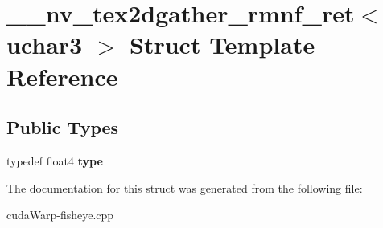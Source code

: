\hypertarget{struct____nv__tex2dgather__rmnf__ret_3_01uchar3_01_4}{}\section{\+\_\+\+\_\+nv\+\_\+tex2dgather\+\_\+rmnf\+\_\+ret$<$ uchar3 $>$ Struct Template Reference}
\label{struct____nv__tex2dgather__rmnf__ret_3_01uchar3_01_4}
\subsection*{Public Types}
\begin{DoxyCompactItemize}
\item 
typedef float4 {\bfseries type}\hypertarget{struct____nv__tex2dgather__rmnf__ret_3_01uchar3_01_4_a0481a8855f6173cbe7e1fbc8589a9fb5}{}\label{struct____nv__tex2dgather__rmnf__ret_3_01uchar3_01_4_a0481a8855f6173cbe7e1fbc8589a9fb5}

\end{DoxyCompactItemize}


The documentation for this struct was generated from the following file\+:\begin{DoxyCompactItemize}
\item 
cuda\+Warp-\/fisheye.\+cpp\end{DoxyCompactItemize}
